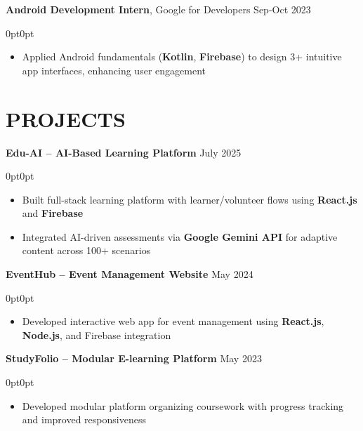 \documentclass[9pt,letterpaper]{article}
\newenvironment{onecolentry}{\begin{adjustwidth}{0pt}{0pt}}{\end{adjustwidth}}
\newenvironment{highlights}{
    \begin{itemize}[
        topsep=0.05cm,
        parsep=0.05cm,
        partopsep=0pt,
        itemsep=0pt,
        leftmargin=8pt
    ]
}{\end{itemize}}
\begin{document}
\noindent
\textbf{Android Development Intern}, Google for Developers \hfill Sep-Oct 2023
\vspace{0.05cm}
\begin{onecolentry}
\begin{highlights}
    \item Applied Android fundamentals (\textbf{Kotlin}, \textbf{Firebase}) to design 3+ intuitive app interfaces, enhancing user engagement
\end{highlights}
\end{onecolentry}

\section{PROJECTS}

\noindent
\textbf{Edu-AI -- AI-Based Learning Platform} \href{https://github.com/VasanthiYarroju/EduAI-AI-Powered-Education-Platform}{\faGithub} \href{https://eduai-portal.vercel.app/}{\faGlobe} \hfill July 2025
\vspace{0.05cm}
\begin{onecolentry}
\begin{highlights}
    \item Built full-stack learning platform with learner/volunteer flows using \textbf{React.js} and \textbf{Firebase}
    \item Integrated AI-driven assessments via \textbf{Google Gemini API} for adaptive content across 100+ scenarios
\end{highlights}
\end{onecolentry}

\vspace{0.1cm}

\noindent
\textbf{EventHub -- Event Management Website} \href{https://github.com/VasanthiYarroju/EventHub}{\faGithub} \hfill May 2024
\vspace{0.05cm}
\begin{onecolentry}
\begin{highlights}
    \item Developed interactive web app for event management using \textbf{React.js}, \textbf{Node.js}, and Firebase integration
\end{highlights}
\end{onecolentry}

\vspace{0.1cm}

\noindent
\textbf{StudyFolio -- Modular E-learning Platform} \href{https://github.com/VasanthiYarroju/Study-folioo}{\faGithub} \href{https://vasanthiyarroju.github.io/Study-folioo/}{\faGlobe} \hfill May 2023
\vspace{0.05cm}
\begin{onecolentry}
\begin{highlights}
    \item Developed modular platform organizing coursework with progress tracking and improved responsiveness
\end{highlights}
\end{onecolentry}
\end{document}
